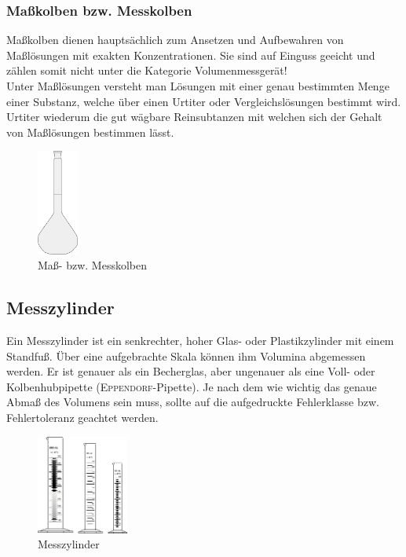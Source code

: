\newpage

\subsubsection{Maßkolben bzw. Messkolben}
Maßkolben dienen hauptsächlich zum Ansetzen und Aufbewahren von Maßlösungen mit exakten Konzentrationen. Sie sind auf Einguss geeicht und zählen somit nicht unter die Kategorie Volumenmessgerät!\\
{\small Unter Maßlösungen versteht man Lösungen mit einer genau bestimmten Menge einer Substanz, welche über einen Urtiter oder Vergleichslösungen bestimmt wird. Urtiter wiederum die gut wägbare Reinsubtanzen mit welchen sich der Gehalt von Maßlösungen bestimmen lässt.}

\begin{figure}[h!]
	\centering
	\includegraphics[width=0.12\textwidth]{img/Messkolben}
	\caption{Maß- bzw. Messkolben}
	\label{fig:messkolben}
\end{figure}
\FloatBarrier


\subsection{Messzylinder}
Ein Messzylinder ist ein senkrechter, hoher Glas- oder Plastikzylinder mit einem Standfuß. Über eine aufgebrachte Skala können ihm Volumina abgemessen werden. Er ist genauer als ein Becherglas, aber ungenauer als eine Voll- oder Kolbenhubpipette (\textsc{Eppendorf}-Pipette). Je nach dem wie wichtig das genaue Abmaß des Volumens sein muss, sollte auf die aufgedruckte Fehlerklasse bzw. Fehlertoleranz geachtet werden.

\begin{figure}[h!]
	\centering
	\includegraphics[width=0.27\textwidth]{img/Messzylinder}
	\caption{Messzylinder}
	\label{fig:messzylinder}
\end{figure}
\FloatBarrier

